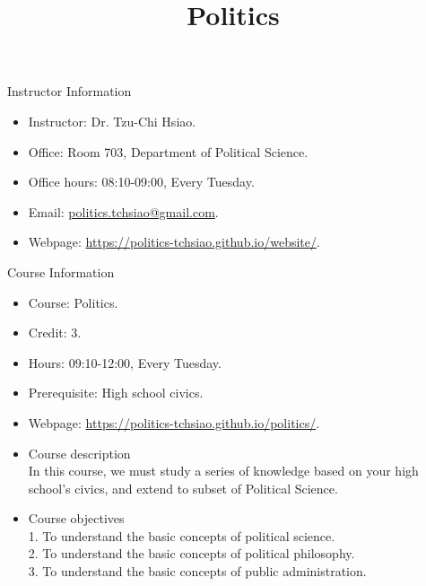 \documentclass{article}
\title{\fontsize{16pt}{16pt}\selectfont Politics}
\author{}
\date{}
\begin{document}
\maketitle
\fontsize{14pt}{14pt}\selectfont
\begin{flushleft}
Instructor Information
\end{flushleft}
\begin{itemize}
\item Instructor: Dr. Tzu-Chi Hsiao. \\
\item Office: Room 703, Department of Political Science. \\
\item Office hours: 08:10-09:00, Every Tuesday. \\
\item Email: \href{mailto:politics.tchsiao@gmail.com}{politics.tchsiao@gmail.com}. \\
\item Webpage: \href{https://politics-tchsiao.github.io/website/}{https://politics-tchsiao.github.io/website/}. \\
\end{itemize}
Course Information \\
\begin{itemize}
\item Course: Politics. \\
\item Credit: 3. \\
\item Hours: 09:10-12:00, Every Tuesday. \\
\item Prerequisite: High school civics. \\
\item Webpage: \href{https://politics-tchsiao.github.io/politics/}{https://politics-tchsiao.github.io/politics/}. \\
\item Course description \\
In this course, we must study a series of knowledge based on your high school's civics, and extend to subset of Political Science. \\ 
\item Course objectives \\
1. To understand the basic concepts of political science. \\
2. To understand the basic concepts of political philosophy. \\
3. To understand the basic concepts of public administration. \\
\end{itemize}
\end{document}
